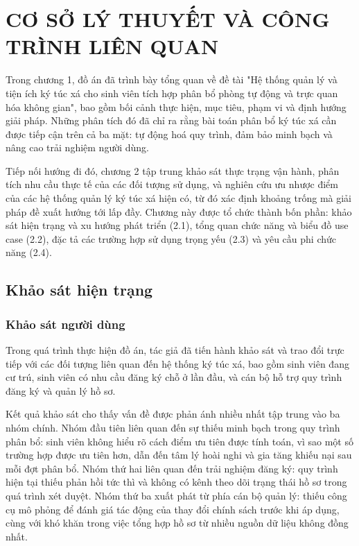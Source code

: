 ﻿\documentclass[a4paper,12pt,openany,oneside]{report}
\begin{document}
\clearpage
\chapter{CƠ SỞ LÝ THUYẾT VÀ CÔNG TRÌNH LIÊN QUAN}

Trong chương 1, đồ án đã trình bày tổng quan về đề tài "Hệ thống quản lý và
tiện ích ký túc xá cho sinh viên tích hợp phân bổ phòng tự động và trực quan
hóa không gian", bao gồm bối cảnh thực hiện, mục tiêu, phạm vi và định hướng
giải pháp. Những phân tích đó đã chỉ ra rằng bài toán phân bổ ký túc xá cần
được tiếp cận trên cả ba mặt: tự động hoá quy trình, đảm bảo minh bạch và nâng
cao trải nghiệm người dùng.

Tiếp nối hướng đi đó, chương 2 tập trung khảo sát thực trạng vận hành, phân
tích nhu cầu thực tế của các đối tượng sử dụng, và nghiên cứu ưu nhược điểm
của các hệ thống quản lý ký túc xá hiện có, từ đó xác định khoảng trống mà
giải pháp đề xuất hướng tới lấp đầy. Chương này được tổ chức thành bốn phần:
khảo sát hiện trạng và xu hướng phát triển (2.1), tổng quan chức năng và biểu
đồ use case (2.2), đặc tả các trường hợp sử dụng trọng yếu (2.3) và yêu cầu
phi chức năng (2.4).

\section{Khảo sát hiện trạng}
\label{sec:survey}

\subsection{Khảo sát người dùng}

Trong quá trình thực hiện đồ án, tác giả đã tiến hành khảo sát và trao đổi
trực tiếp với các đối tượng liên quan đến hệ thống ký túc xá, bao gồm sinh
viên đang cư trú, sinh viên có nhu cầu đăng ký chỗ ở lần đầu, và cán bộ hỗ
trợ quy trình đăng ký và quản lý hồ sơ.

Kết quả khảo sát cho thấy vấn đề được phản ánh nhiều nhất tập trung vào ba
nhóm chính. Nhóm đầu tiên liên quan đến sự thiếu minh bạch trong quy trình
phân bổ: sinh viên không hiểu rõ cách điểm ưu tiên được tính toán, vì sao một
số trường hợp được ưu tiên hơn, dẫn đến tâm lý hoài nghi và gia tăng khiếu
nại sau mỗi đợt phân bổ. Nhóm thứ hai liên quan đến trải nghiệm đăng ký: quy
trình hiện tại thiếu phản hồi tức thì và không có kênh theo dõi trạng thái hồ
sơ trong quá trình xét duyệt. Nhóm thứ ba xuất phát từ phía cán bộ quản lý:
thiếu công cụ mô phỏng để đánh giá tác động của thay đổi chính sách trước khi
áp dụng, cùng với khó khăn trong việc tổng hợp hồ sơ từ nhiều nguồn dữ liệu
không đồng nhất.
\end{document}
